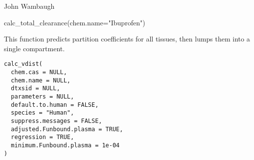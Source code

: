 \documentclass[a4paper]{book}
\begin{document}
%
\begin{Author}\relax
John Wambaugh
\end{Author}
%
\begin{Examples}
\begin{ExampleCode}

calc_total_clearance(chem.name="Ibuprofen") 


\end{ExampleCode}
\end{Examples}
%
\begin{Description}\relax
This function predicts partition coefficients for all tissues, then lumps them
into a single compartment.
\end{Description}
%
\begin{Usage}
\begin{verbatim}
calc_vdist(
  chem.cas = NULL,
  chem.name = NULL,
  dtxsid = NULL,
  parameters = NULL,
  default.to.human = FALSE,
  species = "Human",
  suppress.messages = FALSE,
  adjusted.Funbound.plasma = TRUE,
  regression = TRUE,
  minimum.Funbound.plasma = 1e-04
)
\end{verbatim}
\end{Usage}
%
\end{document}

